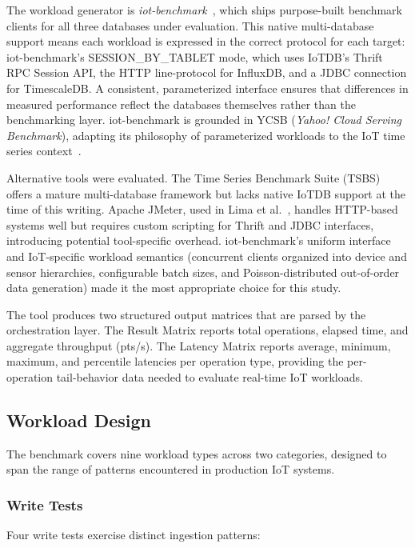 The workload generator is \textit{iot-benchmark}~\citep{iotbenchmark}, which ships purpose-built benchmark clients for all three databases under evaluation.
This native multi-database support means each workload is expressed in the correct protocol
for each target: iot-benchmark's SESSION\_BY\_TABLET mode, which uses IoTDB's Thrift RPC Session API,
the HTTP line-protocol for InfluxDB, and a JDBC connection for TimescaleDB. A consistent, parameterized interface
ensures that differences in measured performance reflect the databases themselves rather
than the benchmarking layer. iot-benchmark is grounded in
YCSB (\textit{Yahoo! Cloud Serving Benchmark}), adapting its philosophy of parameterized workloads
to the IoT time series context~\citep{iotbenchmarkdoc}.

Alternative tools were evaluated. The Time Series Benchmark Suite (TSBS) offers a mature
multi-database framework but lacks native IoTDB support at the time of this writing.
Apache JMeter, used in Lima et al.~\cite{lima2024avaliando}, handles HTTP-based systems well
but requires custom scripting for Thrift and JDBC interfaces, introducing potential tool-specific
overhead. iot-benchmark's uniform interface and IoT-specific workload semantics (concurrent clients
  organized into device and sensor hierarchies, configurable batch sizes, and
Poisson-distributed out-of-order data generation) made it the most appropriate choice
for this study.

The tool produces two structured output matrices that are parsed by the orchestration layer.
The Result Matrix reports total operations, elapsed time, and aggregate throughput (pts/s).
The Latency Matrix reports average, minimum, maximum, and percentile latencies per operation
type, providing the per-operation tail-behavior data needed to evaluate real-time IoT workloads.

\subsection{Workload Design}
\label{sec:workload}

The benchmark covers nine workload types across two categories, designed to span the range
of patterns encountered in production IoT systems.

\subsubsection{Write Tests}

Four write tests exercise distinct ingestion patterns:

